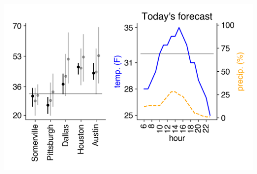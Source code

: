 \documentclass[landscape]{article}
\date{\today}
\begin{document}
\maketitle

\begin{multicols}{3}

\vspace{-0.3cm}\includegraphics[width=\linewidth]{images/weather.png}

{}
\vspace{-0.3cm}


\noindent


\end{multicols}
\end{document}
